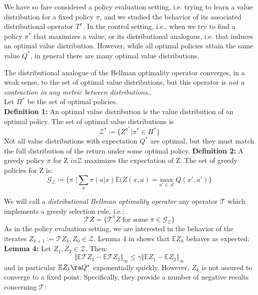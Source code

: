 We have so fare considered a policy evaluation setting, i.e. trying to learn a value
distribution for a fixed policy $\pi $, and we studied
the behavior of its associated distributional operator $T^\pi $.
In the control setting, i.e., when we try to find a policy $\pi^{*} $ that maximizes a
value, or its distributional analogous, i.e. that
induces an optimal value distribution. However, while all optimal policies attain the
same value $Q^{*}$, in general there are
many optimal value distributions.

The distributional analogue of the Bellman optimality operator converges, in a weak sense,
to the set of optimal value distributions, but
this operator is \textit{not a contraction in any metric between distributions.}.\\
Let $\Pi^*$ be the set of optimal policies.\\
\textbf{Definition 1:} 
An optimal value distribution is the value distribution of an optimal policy. The set of optimal value distributions is 
\begin{equation*}
    \mathcal{Z^*} \coloneqq \big\{ Z^{\pi^*} | \pi^{*} \in  \Pi^*   \big\}
\end{equation*}
Not all value distributions with expectation $Q^*$ are optimal, but they must match the full distribution of the return
under some optimal policy.
\textbf{Definition 2:} 
A greedy policy $\pi$ for Z $in \mathcal{Z}$ maximizes the expectation of Z. The set of greedy policies for Z is:
\begin{equation*}
    \mathcal{G_Z} \coloneqq \big\{ \pi  \; | \sum_a \pi(a|x) \mathbb E (Z(x,a) = \underset{a'\in \mathcal{A}}{\text{max}}  \; Q(x',a')   \big\}
\end{equation*}

We will call a \textit{distributional Bellman optimality operator} any operator $\mathcal{T}$ which implements a greedy selection
rule, i.e.:
\begin{equation*}
    \mathcal{T}Z = \big\{ \mathcal{T}^\pi Z \; \text{for some}\; \pi \in   \mathcal{G_Z} \big\}
\end{equation*}
As in the policy evaluation setting, we are interested in the behavior of the iterates 
$Z_{k+1} := \mathcal{T}Z_k, Z_0 \in \mathcal{Z}$.
Lemma 4 in \cite{Bellemare2017} shows that $\mathbb E Z_k$ behaves as expected:
\textbf{Lemma 4:} Let $Z_1, Z_2 \in \mathcal{Z}$. Then:
\begin{equation*}
    \Vert   \mathbb E \mathcal{T}Z_1 - \mathbb E \mathcal{T} Z_2 \Vert_\infty \leq \gamma\Vert \mathbb E Z_1 - \mathbb E Z_2 \Vert_\infty 
\end{equation*}
and in particular $\mathbb E Z_1 \ra Q^* $ exponentially  quickly.
However, $Z_k$ is not assured to converge to a fixed point.
Specifically, they provide a number of negative results concerning $\mathcal{T}$:

